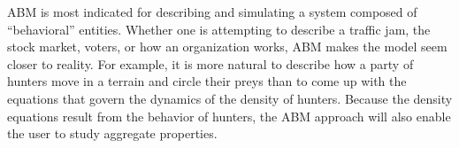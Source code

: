 \documentclass{report}
\begin{document}
ABM is most indicated for describing and simulating a system composed of “behavioral” entities. Whether one is attempting to describe a traffic jam, the stock market, voters, or how an organization works, ABM makes the model seem closer to reality. For example, it is more natural to describe how a party of hunters move in a terrain and circle their preys than to come up with the equations that govern the dynamics of the density of hunters. Because the density equations result from the behavior of hunters, the ABM approach will also enable the user to study aggregate properties.  

\end{document}
